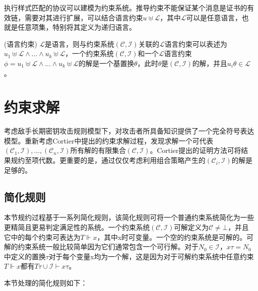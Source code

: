 
执行样式匹配的协议可以建模为约束系统。推导约束不能保证某个消息是证书的有效链，需要对其进行扩展，可以结合语言约束$u\uplus\mathcal{L}$，其中$\mathcal{L}$可以是任意语言，也就是任意项集，特别将其定义为递归语言。


\begin{definition}{(语言约束)}
$\mathcal{L}$是语言，则与约束系统$(\mathcal{C},\mathcal{I})$关联的$\mathcal{L}$语言约束可以表述为$u_{1}\uplus\mathcal{\mathcal{L}\wedge}...\wedge u_{k}\uplus\mathcal{L}$，一个约束系统$(\mathcal{C},\mathcal{I})$和一个$\mathcal{L}$语言约束$\phi=u_{1}\uplus\mathcal{\mathcal{L}\wedge}...\wedge u_{k}\uplus\mathcal{L}$的解是一个基置换$\theta$，此时$\theta$是$(\mathcal{C},\mathcal{I})$的解，并且$u_i\theta \in \mathcal{L}$。

\end{definition}


\section{约束求解}
    考虑敌手长期密钥攻击规则模型下，对攻击者所具备知识提供了一个完全符号表达模型。重新考虑Cortier中提出的约束求解过程\cite{Cortier2012}，发现求解一个可代表$(\mathcal{C}_{1},\mathcal{I}),...,(\mathcal{C}_{n},\mathcal{I})$所有解的有限集合$(\mathcal{C},\mathcal{I})$。Cortier提出的证明方法可将结果规约至项代数\cite{Cortier2012}。更重要的是，通过仅仅考虑利用组合策略产生的$(\mathcal{C}_{i},\mathcal{I})$的解是足够的。

\subsection{简化规则}
    本节规约过程基于一系列简化规则，该简化规则可将一个普通约束系统简化为一些更精简且更易判定满足性的系统。一个约束系统$(\mathcal{C},\mathcal{I})$可解定义为$\mathcal{C}\neq\bot$，并且它中的每个约束可表达为$T\Vdash x$，其中x时可变量。一个空的约束系统是可解的。可解的约束系统一般比较简单因为它们通常包含一个可行解。对于$N_{0}\in\mathcal{I}$，$x\tau=N_{0}$中定义的置换$\tau$对于每个变量x均为一个解，这是因为对于可解约束系统中任意约束$T\Vdash x$都有$T\tau\cup\mathcal{I}\vdash x\tau$。

    本节处理的简化规则如下：
 

